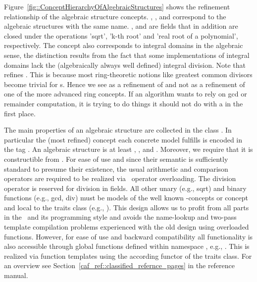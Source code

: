 Figure~\ref{fig::ConceptHierarchyOfAlgebraicStructures} shows the refinement 
relationship of the algebraic structure concepts. 
, ,   and 
 correspond to the algebraic structures with the
same name. ,  and 
 are fields that in addition are closed under 
the operations 'sqrt', 'k-th root' and 'real root of a polynomial', 
respectively. The concept  also
corresponds to integral domains in the algebraic sense, the
distinction results from the fact that some implementations of
integral domains lack the (algebraically always well defined) integral 
division.
Note that  refines . This is because 
most ring-theoretic notions like greatest common divisors become trivial for 
s. Hence we see  as a refinement of 
 and not as a 
refinement of one of the more advanced ring concepts. 
If an algorithm wants to rely on gcd or remainder computation, it is trying 
to do things it should not do with a  in the first place. 


The main properties of an algebraic structure are collected in the class   
. 
In particular the (most refined) concept each concrete model  
fulfills is encoded in the tag 
.
An algebraic structure is at least , 
,  and 
. Moreover, we require that it is
constructible from .
For ease of use and since their semantic is sufficiently standard to presume 
their existence, the usual arithmetic and comparison operators are required
to be realized via \CC\ operator overloading. 
The division operator is reserved for division in fields.  
All other unary (e.g., sqrt) and binary functions 
(e.g., gcd, div) must be models of the well known \stl-concepts
 or 
concept and local to the traits class 
(e.g., ). 
This design allows us to profit from all parts in the 
\stl\ and its programming style and avoids the name-lookup and 
two-pass template compilation problems experienced with the old design 
using overloaded functions. However, for ease of use and backward 
compatibility all functionality is also 
accessible through global functions defined within namespace , 
e.g., . This is realized via function templates using 
the according functor of the traits class. For an overview see 
Section~\ref{caf_ref::classified_refernce_pages} in the reference manual.

